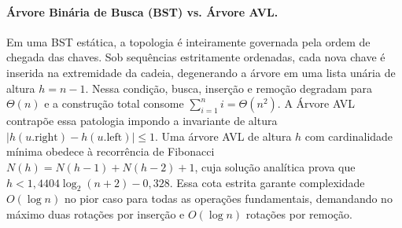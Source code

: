 \documentclass[11pt, a4paper]{article}
\begin{document}
\begin{table}[htbp]
\centering
\scriptsize
{}
\caption{Complexidade assintótica frente a BST e AVL.}
\label{tab:complexidade}
\end{table}

\paragraph{Árvore Binária de Busca (BST) vs. Árvore AVL.}
Em uma BST estática, a topologia é inteiramente governada pela ordem de chegada das chaves. Sob sequências estritamente ordenadas, cada nova chave é inserida na extremidade da cadeia, degenerando a árvore em uma lista unária de altura $h = n-1$. Nessa condição, busca, inserção e remoção degradam para $\Theta(n)$ e a construção total consome $\sum_{i=1}^{n} i = \Theta(n^2)$. A Árvore AVL contrapõe essa patologia impondo a invariante de altura $|h(u.\mathrm{right}) - h(u.\mathrm{left})| \le 1$. Uma árvore AVL de altura $h$ com cardinalidade mínima obedece à recorrência de Fibonacci $N(h) = N(h-1) + N(h-2) + 1$, cuja solução analítica prova que $h < 1{,}4404\log_2(n+2) - 0{,}328$. Essa cota estrita garante complexidade $O(\log n)$ no pior caso para todas as operações fundamentais, demandando no máximo duas rotações por inserção e $O(\log n)$ rotações por remoção.
\end{document}
